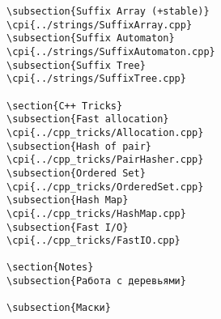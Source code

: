 {\begin{verbatim}
\subsection{Suffix Array (+stable)}
\cpi{../strings/SuffixArray.cpp}
\subsection{Suffix Automaton}
\cpi{../strings/SuffixAutomaton.cpp}
\subsection{Suffix Tree}
\cpi{../strings/SuffixTree.cpp}

\section{C++ Tricks}
\subsection{Fast allocation}
\cpi{../cpp_tricks/Allocation.cpp}
\subsection{Hash of pair}
\cpi{../cpp_tricks/PairHasher.cpp}
\subsection{Ordered Set}
\cpi{../cpp_tricks/OrderedSet.cpp}
\subsection{Hash Map}
\cpi{../cpp_tricks/HashMap.cpp}
\subsection{Fast I/O}
\cpi{../cpp_tricks/FastIO.cpp}

\section{Notes}
\subsection{Работа с деревьями}

\subsection{Маски}


\end{verbatim}}
